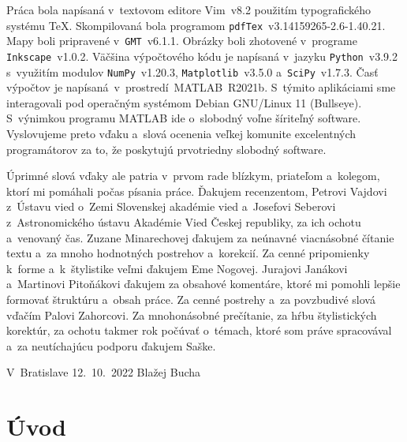 \documentclass[a4paper, 12pt]{book}
\begin{document}
Práca bola napísaná v~textovom editore Vim~v8.2 použitím typografického systému
\TeX.  Skompilovaná bola programom \texttt{pdfTex}~v3.14159265-2.6-1.40.21.
Mapy boli pripravené v~\texttt{GMT}~v6.1.1.  Obrázky boli zhotovené v~programe
\texttt{Inkscape}~v1.0.2.  Väčšina výpočtového kódu je napísaná
v~jazyku \texttt{Python}~v3.9.2 s~využitím modulov
\texttt{NumPy}~v1.20.3, \texttt{Matplotlib}~v3.5.0 a~\texttt{SciPy}~v1.7.3.
Časť výpočtov je napísaná~v~prostredí~MATLAB~R2021b.
S~týmito aplikáciami sme interagovali pod operačným systémom Debian GNU/Linux
11 (Bullseye).  S~výnimkou programu MATLAB ide o~slobodný voľne šíriteľný
software.  Vyslovujeme preto vďaku a~slová ocenenia veľkej komunite
excelentných programátorov za to, že poskytujú prvotriedny slobodný software.

Úprimné slová vďaky ale patria v~prvom rade blízkym, priateľom a~kolegom, ktorí 
mi pomáhali počas písania práce.  Ďakujem recenzentom, Petrovi Vajdovi z~Ústavu 
vied o~Zemi Slovenskej akadémie vied a~Josefovi Seberovi z~Astronomického 
ústavu Akadémie Vied Českej republiky, za ich ochotu a~venovaný čas.  Zuzane 
Minarechovej ďakujem za neúnavné viacnásobné čítanie textu a~za mnoho 
hodnotných postrehov a~korekcií.  Za cenné pripomienky k~forme a~k~štylistike 
veľmi ďakujem Eme Nogovej.  Jurajovi Janákovi a~Martinovi Pitoňákovi ďakujem za 
obsahové komentáre, ktoré mi pomohli lepšie formovať štruktúru a~obsah práce.  
Za cenné postrehy a~za povzbudivé slová vďačím Palovi Zahorcovi.  Za 
mnohonásobné prečítanie, za hŕbu štylistických korektúr, za ochotu takmer rok 
počúvať o~témach, ktoré som práve spracovával a~za neutíchajúcu podporu ďakujem 
Saške.


\vspace{4ex}

\noindent V~Bratislave 12.~10.~2022 \hfill Blažej Bucha






\tableofcontents
\newpage







\chapter*{Úvod}
\label{sec:introduction}
\end{document}
